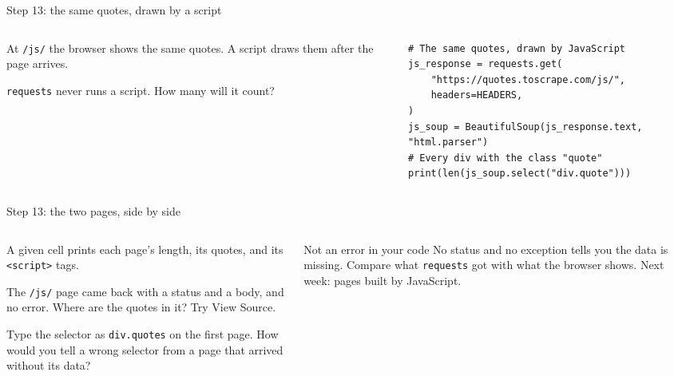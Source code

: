 \documentclass[9pt,aspectratio=169]{beamer}
\begin{document}
\begin{frame}[fragile]{Step 13: the same quotes, drawn by a script}
    \begin{columns}[T]
        \begin{column}{0.37\textwidth}
            At \texttt{/js/} the browser shows the same quotes. A script draws them after the page arrives.

            \medskip
            \texttt{requests} never runs a script. How many will it count?
        \end{column}
        \begin{column}{0.6\textwidth}
\begin{lstlisting}
# The same quotes, drawn by JavaScript
js_response = requests.get(
    "https://quotes.toscrape.com/js/",
    headers=HEADERS,
)
js_soup = BeautifulSoup(js_response.text, "html.parser")
# Every div with the class "quote"
print(len(js_soup.select("div.quote")))
\end{lstlisting}
        \end{column}
    \end{columns}
\end{frame}

\begin{frame}{Step 13: the two pages, side by side}
    \begin{columns}[T]
        \begin{column}{0.6\textwidth}
            A given cell prints each page's length, its quotes, and its \texttt{<script>} tags.

            \medskip
            The \texttt{/js/} page came back with a status and a body, and no error. Where are the quotes in it? Try View Source.

            \medskip
            Type the selector as \texttt{div.quotes} on the first page. How would you tell a wrong selector from a page that arrived without its data?
        \end{column}
        \begin{column}{0.35\textwidth}
            \begin{alertblock}{Not an error in your code}
                \footnotesize No status and no exception tells you the data is missing. Compare what \texttt{requests} got with what the browser shows. Next week: pages built by JavaScript.
            \end{alertblock}
        \end{column}
    \end{columns}
\end{frame}
\end{document}
